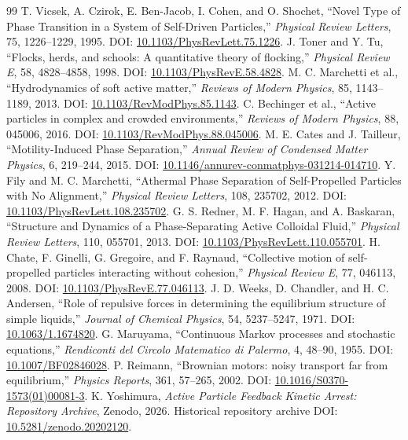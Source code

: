\documentclass[11pt]{article}
\begin{document}
\begin{thebibliography}{99}
 T. Vicsek, A. Czirok, E. Ben-Jacob, I. Cohen, and O. Shochet, ``Novel Type of Phase Transition in a System of Self-Driven Particles,'' \emph{Physical Review Letters}, 75, 1226--1229, 1995. DOI: \href{https://doi.org/10.1103/PhysRevLett.75.1226}{10.1103/PhysRevLett.75.1226}.
 J. Toner and Y. Tu, ``Flocks, herds, and schools: A quantitative theory of flocking,'' \emph{Physical Review E}, 58, 4828--4858, 1998. DOI: \href{https://doi.org/10.1103/PhysRevE.58.4828}{10.1103/PhysRevE.58.4828}.
 M. C. Marchetti et al., ``Hydrodynamics of soft active matter,'' \emph{Reviews of Modern Physics}, 85, 1143--1189, 2013. DOI: \href{https://doi.org/10.1103/RevModPhys.85.1143}{10.1103/RevModPhys.85.1143}.
 C. Bechinger et al., ``Active particles in complex and crowded environments,'' \emph{Reviews of Modern Physics}, 88, 045006, 2016. DOI: \href{https://doi.org/10.1103/RevModPhys.88.045006}{10.1103/RevModPhys.88.045006}.
 M. E. Cates and J. Tailleur, ``Motility-Induced Phase Separation,'' \emph{Annual Review of Condensed Matter Physics}, 6, 219--244, 2015. DOI: \href{https://doi.org/10.1146/annurev-conmatphys-031214-014710}{10.1146/annurev-conmatphys-031214-014710}.
 Y. Fily and M. C. Marchetti, ``Athermal Phase Separation of Self-Propelled Particles with No Alignment,'' \emph{Physical Review Letters}, 108, 235702, 2012. DOI: \href{https://doi.org/10.1103/PhysRevLett.108.235702}{10.1103/PhysRevLett.108.235702}.
 G. S. Redner, M. F. Hagan, and A. Baskaran, ``Structure and Dynamics of a Phase-Separating Active Colloidal Fluid,'' \emph{Physical Review Letters}, 110, 055701, 2013. DOI: \href{https://doi.org/10.1103/PhysRevLett.110.055701}{10.1103/PhysRevLett.110.055701}.
 H. Chate, F. Ginelli, G. Gregoire, and F. Raynaud, ``Collective motion of self-propelled particles interacting without cohesion,'' \emph{Physical Review E}, 77, 046113, 2008. DOI: \href{https://doi.org/10.1103/PhysRevE.77.046113}{10.1103/PhysRevE.77.046113}.
 J. D. Weeks, D. Chandler, and H. C. Andersen, ``Role of repulsive forces in determining the equilibrium structure of simple liquids,'' \emph{Journal of Chemical Physics}, 54, 5237--5247, 1971. DOI: \href{https://doi.org/10.1063/1.1674820}{10.1063/1.1674820}.
 G. Maruyama, ``Continuous Markov processes and stochastic equations,'' \emph{Rendiconti del Circolo Matematico di Palermo}, 4, 48--90, 1955. DOI: \href{https://doi.org/10.1007/BF02846028}{10.1007/BF02846028}.
 P. Reimann, ``Brownian motors: noisy transport far from equilibrium,'' \emph{Physics Reports}, 361, 57--265, 2002. DOI: \href{https://doi.org/10.1016/S0370-1573(01)00081-3}{10.1016/S0370-1573(01)00081-3}.
 K. Yoshimura, \emph{Active Particle Feedback Kinetic Arrest: Repository Archive}, Zenodo, 2026. Historical repository archive DOI: \href{https://doi.org/10.5281/zenodo.20202120}{10.5281/zenodo.20202120}.
\end{thebibliography}
\end{document}
